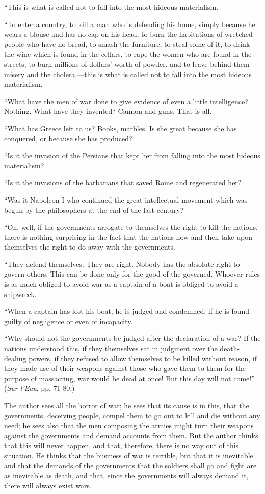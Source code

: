 \documentclass{book}
\begin{document}
“This is what is called not to fall into the most hideous materialism.

“To enter a country, to kill a man who is defending his home, simply because he wears a blouse and has no cap on his head, to burn the habitations of wretched people who have no bread, to smash the furniture, to steal some of it, to drink the wine which is found in the cellars, to rape the women who are found in the streets, to burn millions of dollars’ worth of powder, and to leave behind them misery and the cholera,—this is what is called not to fall into the most hideous materialism.

“What have the men of war done to give evidence of even a little intelligence? Nothing. What have they invented? Cannon and guns. That is all.

“What has Greece left to us? Books, marbles. Is she great because she has conquered, or because she has produced?

“Is it the invasion of the Persians that kept her from falling into the most hideous materialism?

“Is it the invasions of the barbarians that saved Rome and regenerated her?

“Was it Napoleon I who continued the great intellectual movement which was begun by the philosophers at the end of the last century?

“Oh, well, if the governments arrogate to themselves the right to kill the nations, there is nothing surprising in the fact that the nations now and then take upon themselves the right to do away with the governments.

“They defend themselves. They are right. Nobody has the absolute right to govern others. This can be done only for the good of the governed. Whoever rules is as much obliged to avoid war as a captain of a boat is obliged to avoid a shipwreck.

“When a captain has lost his boat, he is judged and condemned, if he is found guilty of negligence or even of incapacity.

“Why should not the governments be judged after the declaration of a war? If the nations understood this, if they themselves sat in judgment over the death-dealing powers, if they refused to allow themselves to be killed without reason, if they made use of their weapons against those who gave them to them for the purpose of massacring, war would be dead at once! But this day will not come!” (\emph{Sur l’Eau}, pp. 71-80.)

The author sees all the horror of war; he sees that its cause is in this, that the governments, deceiving people, compel them to go out to kill and die without any need; he sees also that the men composing the armies might turn their weapons against the governments and demand accounts from them. But the author thinks that this will never happen, and that, therefore, there is no way out of this situation. He thinks that the business of war is terrible, but that it is inevitable and that the demands of the governments that the soldiers shall go and fight are as inevitable as death, and that, since the governments will always demand it, there will always exist wars.
\end{document}
